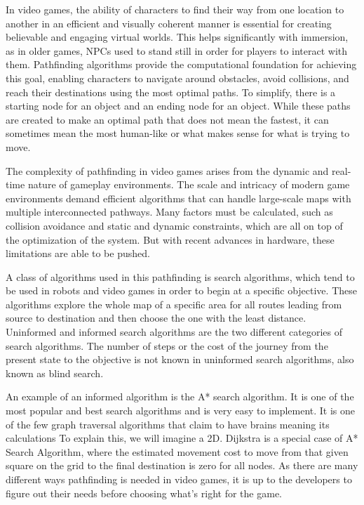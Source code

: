 \documentclass{article}
\theoremstyle{theorem}
\theoremstyle{definition}
\theoremstyle{remark}
\begin{document}
\medskip\indent
In video games, the ability of characters to find their way from one location to another in an efficient and visually coherent manner is essential for creating believable and engaging virtual worlds. This helps significantly with immersion, as in older games, NPCs used to stand still in order for players to interact with them. Pathfinding algorithms provide the computational foundation for achieving this goal, enabling characters to navigate around obstacles, avoid collisions, and reach their destinations using the most optimal paths.\cite{Sra} To simplify, there is a starting node for an object and an ending node for an object. While these paths are created to make an optimal path that does not mean the fastest, it can sometimes mean the most human-like or what makes sense for what is trying to move.

\medskip\indent
The complexity of pathfinding in video games arises from the dynamic and real-time nature of gameplay environments. The scale and intricacy of modern game environments demand efficient algorithms that can handle large-scale maps with multiple interconnected pathways. Many factors must be calculated, such as collision avoidance and static and dynamic constraints, which are all on top of the optimization of the system. But with recent advances in hardware, these limitations are able to be pushed.

\medskip\indent
A class of algorithms used in this pathfinding is search algorithms, which tend to be used in robots and video games in order to begin at a specific objective. These algorithms explore the whole map of a specific area for all routes leading from source to destination and then choose the one with the least distance. Uninformed and informed search algorithms are the two different categories of search algorithms.\cite{Spa} The number of steps or the cost of the journey from the present state to the objective is not known in uninformed search algorithms, also known as blind search.

\medskip\indent
An example of an informed algorithm is the A* search algorithm. It is one of the most popular and best search algorithms and is very easy to implement. It is one of the few graph traversal algorithms that claim to have brains meaning its calculations To explain this, we will imagine a 2D. Dijkstra is a special case of A* Search Algorithm, where the estimated movement cost to move from that given square on the grid to the final destination is zero for all nodes.\cite{Aaa} As there are many different ways pathfinding is needed in video games, it is up to the developers to figure out their needs before choosing what's right for the game.
\end{document}
